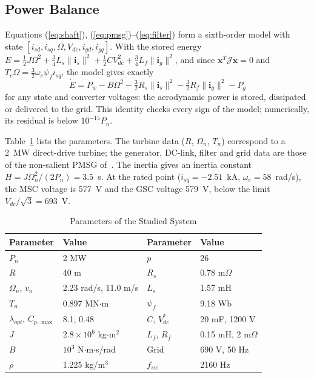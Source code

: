 \documentclass[11pt,a4paper]{article}
\newcommand{\bv}[1]{\mathbf{#1}}
\newcommand{\Jm}{\boldsymbol{\mathcal{J}}}
\begin{document}
\subsection{Power Balance}
Equations (\ref{eq:shaft}), (\ref{eq:pmsg})--(\ref{eq:filter}) form a sixth-order model with state
$[i_{sd},i_{sq},\Omega,V_{dc},i_{gd},i_{gq}]$. With the stored energy
$E=\frac12J\Omega^2+\frac34L_s\|\bv{i}_s\|^2+\frac12CV_{dc}^2+\frac34L_f\|\bv{i}_g\|^2$, and since
$\bv{x}^T\Jm\bv{x}=0$ and $T_e\Omega=\frac32\omega_e\psi_fi_{sq}$, the model gives exactly
\begin{equation}
\dot E = P_w - B\Omega^2 - \tfrac32R_s\|\bv{i}_s\|^2 - \tfrac32R_f\|\bv{i}_g\|^2 - P_g
\label{eq:balance}
\end{equation}
for any state and converter voltages: the aerodynamic power is stored, dissipated or delivered to the
grid. This identity checks every sign of the model; numerically, its residual is below
$10^{-15}P_n$.

Table~\ref{tab:param} lists the parameters. The turbine data ($R$, $\Omega_n$, $T_n$) correspond to a
2~MW direct-drive turbine; the generator, DC-link, filter and grid data are those of the non-salient
PMSG of~\cite{hasan2021}. The inertia gives an inertia constant $H=J\Omega_n^2/(2P_n)=3.5$~s. At the
rated point ($i_{sq}=-2.51$~kA, $\omega_e=58$~rad/s), the MSC voltage is 577~V and the GSC voltage
579~V, below the limit $V_{dc}/\sqrt3=693$~V.

\begin{table}[h]
\caption{Parameters of the Studied System}
\label{tab:param}
\centering
\footnotesize
\setlength{\tabcolsep}{4pt}
\begin{tabular}{llll}
\toprule
Parameter & Value & Parameter & Value\\
\midrule
$P_n$ & 2 MW & $p$ & 26\\
$R$ & 40 m & $R_s$ & 0.78 m$\Omega$\\
$\Omega_n$, $v_n$ & 2.23 rad/s, 11.0 m/s & $L_s$ & 1.57 mH\\
$T_n$ & 0.897 MN$\cdot$m & $\psi_f$ & 9.18 Wb\\
$\lambda_{opt}$, $C_{p,\max}$ & 8.1, 0.48 & $C$, $V_{dc}^*$ & 20 mF, 1200 V\\
$J$ & $2.8\times10^6$ kg$\cdot$m$^2$ & $L_f$, $R_f$ & 0.15 mH, 2 m$\Omega$\\
$B$ & $10^3$ N$\cdot$m$\cdot$s/rad & Grid & 690 V, 50 Hz\\
$\rho$ & 1.225 kg/m$^3$ & $f_{sw}$ & 2160 Hz\\
\bottomrule
\end{tabular}
\end{table}
\end{document}
